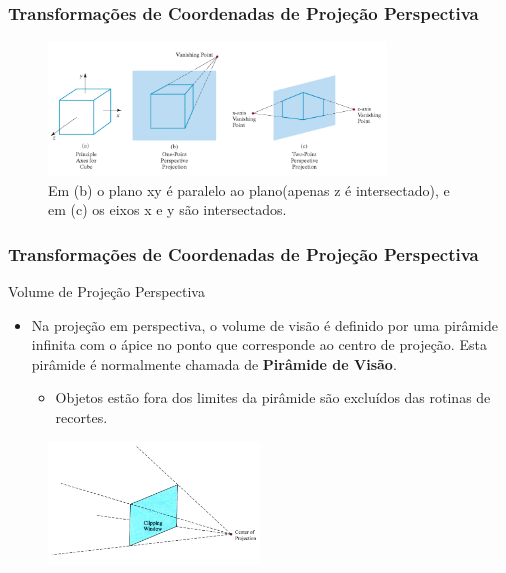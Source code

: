 \documentclass{beamer}
\begin{document}
\begin{frame}
\frametitle{Transformações de Coordenadas de Projeção Perspectiva}
	\begin{figure}[!h]
			\begin{center}
			\includegraphics[width=0.8\textwidth]{Figures/PonFug}
			\caption{Em (b) o plano xy é paralelo ao plano(apenas z é intersectado), e em (c) os eixos x e y são intersectados.}
			\end{center}
	\end{figure}
\end{frame}

\begin{frame}
\frametitle{Transformações de Coordenadas de Projeção Perspectiva}
	\begin{block}{Volume de Projeção Perspectiva}
		\begin{itemize}
			\item Na projeção em perspectiva, o volume de visão é definido por uma pirâmide infinita com o ápice no ponto que corresponde ao centro de projeção. Esta pirâmide é normalmente chamada de \textbf{Pirâmide de Visão}.
			\begin{itemize}
				\item Objetos estão fora dos limites da pirâmide são excluídos das rotinas de recortes.
			\end{itemize}
		\end{itemize}	
	\end{block}
	
		\begin{figure}[!h]
			\begin{center}
			\includegraphics[width=0.5\textwidth]{Figures/VolPir}
			\end{center}
	\end{figure}
\end{frame}
\end{document}
